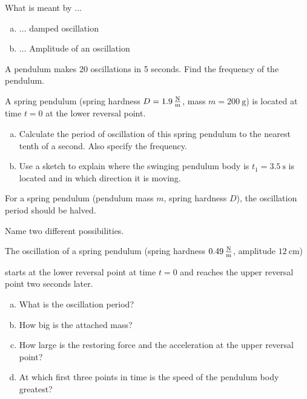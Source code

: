 \documentclass[a4paper]{article}
\begin{document}
	
	\begin{enumerate}[1.]
		
		{\bf \item What is meant by $\dots$}
		
		\begin{enumerate}[a)]
			\item $\dots$ damped oscillation
			\item $\dots$ Amplitude of an oscillation
		\end{enumerate}
		
		{\bf \item A pendulum makes 20 oscillations in 5 seconds. Find the frequency of the pendulum.}
		
		{\bf \item A spring pendulum (spring hardness $D=\SI{1.9}{\newton\over\meter}$, mass $m=\SI{200}{\gram}$) is located at time $t =0$ at the lower reversal point.}
		
		\begin{enumerate}[a)]
			\item Calculate the period of oscillation of this spring pendulum to the nearest tenth of a second. Also specify the frequency.
			\item Use a sketch to explain where the swinging pendulum body is
			$t_1=\SI{3,5}{\second}$ is located and in which direction it is moving.
		\end{enumerate}
		
		{\bf \item For a spring pendulum (pendulum mass $m$, spring hardness $D$), the oscillation period should be halved.} Name two different possibilities.
		
		
		{\bf \item The oscillation of a spring pendulum (spring hardness $\SI{0.49}{\newton\over\meter}$, amplitude $\SI{12}{\centi\meter}$)}
		starts at the lower reversal point at time $t=0$ and reaches the upper reversal point two seconds later.
		
		\begin{enumerate}[a)]
			\item What is the oscillation period?
			\item How big is the attached mass?
			\item How large is the restoring force and the acceleration at the upper reversal point?
			\item At which first three points in time is the speed of the pendulum body greatest?
		\end{enumerate}
		

\end{enumerate}
\end{document}
